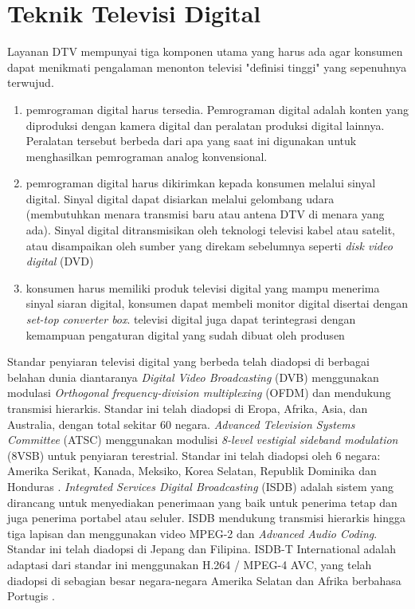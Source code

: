 \section{Teknik Televisi Digital}
\hspace{1,2cm}Layanan DTV mempunyai tiga komponen utama yang harus ada agar konsumen dapat menikmati pengalaman menonton televisi "definisi tinggi" yang sepenuhnya terwujud.

\begin{enumerate}
	\item pemrograman digital harus tersedia. Pemrograman digital adalah konten yang diproduksi dengan kamera digital dan peralatan produksi digital lainnya. Peralatan tersebut berbeda dari apa yang saat ini digunakan untuk menghasilkan pemrograman analog konvensional.
	\item pemrograman digital harus dikirimkan kepada konsumen melalui sinyal digital. Sinyal digital dapat disiarkan melalui gelombang udara (membutuhkan menara transmisi baru atau antena DTV di menara yang ada). Sinyal digital ditransmisikan oleh teknologi televisi kabel atau satelit, atau disampaikan oleh sumber yang direkam sebelumnya seperti \textit{disk video digital} (DVD)
	\item konsumen harus memiliki produk televisi digital yang mampu menerima sinyal siaran digital, konsumen dapat membeli monitor digital disertai dengan \textit{set-top converter box}. televisi digital juga dapat terintegrasi dengan kemampuan pengaturan digital yang sudah dibuat oleh produsen \citep{Kruger2002}
\end{enumerate}

Standar penyiaran televisi digital yang berbeda telah diadopsi di berbagai belahan dunia diantaranya \textit{Digital Video Broadcasting} (DVB) menggunakan modulasi \textit{Orthogonal frequency-division multiplexing} (OFDM) dan mendukung transmisi hierarkis. Standar ini telah diadopsi di Eropa, Afrika, Asia, dan Australia, dengan total sekitar 60 negara. \textit{Advanced Television Systems Committee} (ATSC) menggunakan modulisi \textit{8-level vestigial sideband modulation} (8VSB) untuk penyiaran terestrial. Standar ini telah diadopsi oleh 6 negara: Amerika Serikat, Kanada, Meksiko, Korea Selatan, Republik Dominika dan Honduras \citep{dtvstatus2017}.  \textit{Integrated Services Digital Broadcasting} (ISDB) adalah sistem yang dirancang untuk menyediakan penerimaan yang baik untuk penerima tetap dan juga penerima portabel atau seluler. ISDB mendukung transmisi hierarkis hingga tiga lapisan dan menggunakan video MPEG-2 dan \textit{Advanced Audio Coding}. Standar ini telah diadopsi di Jepang dan Filipina. ISDB-T International adalah adaptasi dari standar ini menggunakan H.264 / MPEG-4 AVC, yang telah diadopsi di sebagian besar negara-negara Amerika Selatan dan Afrika berbahasa Portugis \citep{Ong2010}.



